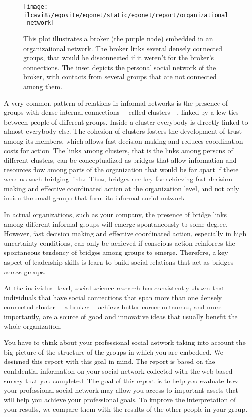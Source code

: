 \documentclass[a4paper,12pt]{article}
\begin{document}
\begin{figure}[H]
\centering
\texttt{[image: ilcavi87/egosite/egonet/static/egonet/report/organizational\_network]}
\caption{This plot illustrates a broker (the purple node) embedded in an organizational network. The broker links several densely connected groups, that would be disconnected if it weren't for the broker's connections. The inset depicts the personal social network of the broker, with contacts from several groups that are not connected among them.}
\end{figure}


A very common pattern of relations in informal networks is the presence of groups with dense internal connections ---called clusters---, linked by a few ties between people of different groups. Inside a cluster everybody is directly linked to almost everybody else. The cohesion of clusters fosters the development of trust among its members, which allows fast decision making and reduces coordination costs for action. The links among clusters, that is the links among persons of different clusters, can be conceptualized as bridges that allow information and resources flow among parts of the organization that would be far apart if there were no such bridging links. Thus, bridges are key for achieving fast decision making and effective coordinated action at the organization level, and not only inside the small groups that form its informal social network.

In actual organizations, such as your company, the presence of bridge links among different informal groups will emerge spontaneously to some degree. However, fast decision making and effective coordinated action, especially in high uncertainty conditions, can only be achieved if conscious action reinforces the spontaneous tendency of bridges among groups to emerge. Therefore, a key aspect of leadership skills is learn to build social relations that act as bridges across groups.

At the individual level, social science research has consistently shown that individuals that have social connections that span more than one densely connected cluster ---a broker--- achieve better career outcomes, and more importantly, are a source of good and innovative ideas that usually benefit the whole organization.

You have to think about your professional social network taking into account the big picture of the structure of the groups in which you are embedded. We designed this report with this goal in mind. The report is based on the confidential information on your social network collected with the web-based survey that you completed. The goal of this report is to help you evaluate how your professional social network may allow you access to important assets that will help you achieve your professional goals. To improve the interpretation of your results, we compare them with the results of the other people in your group.
\end{document}

